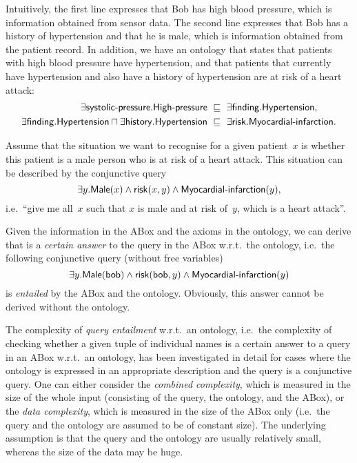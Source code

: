 \noindent
Intuitively, the first line expresses that Bob has high blood pressure, which is
information obtained from sensor data.  The second line expresses that Bob has a
history of hypertension and that he is male, which is information obtained from
the patient record.
%
In addition, we have an ontology that states that patients with high blood
pressure have hypertension, and that patients that currently have hypertension
and also have a history of hypertension are at risk of a heart attack:
\begin{align*}
     \exists\mathsf{systolic\text{-}pressure}.\mathsf{High\text{-}pressure}\
    &\sqsubseteq\ \exists\mathsf{finding}.\mathsf{Hypertension},\\
     \exists\mathsf{finding}.\mathsf{Hypertension}\sqcap\exists\mathsf{history}.\mathsf{Hypertension}\
    &\sqsubseteq\ \exists\mathsf{risk}.\mathsf{Myocardial\text{-}infarction}.
\end{align*}

Assume that the situation we want to recognise for a given patient~$x$ is
whether this patient is a male person who is at risk of a heart attack.  This
situation can be described by the conjunctive query
\[\exists y.\mathsf{Male}(x)\land\mathsf{risk}(x,y)\land\mathsf{Myocardial\text{-}infarction}(y),\]
i.e.~\enquote{give me all~$x$ such that $x$ is male and at risk of~$y$, which is
a heart attack}.

Given the information in the ABox and the axioms in the ontology, we can derive
that \bob is a \emph{certain answer} to the query in the ABox w.r.t.\ the
ontology, i.e.~the following conjunctive query (without free variables)
\[\exists y.\mathsf{Male}(\mathsf{bob})\land\mathsf{risk}(\mathsf{bob},y)\land\mathsf{Myocardial\text{-}infarction}(y)\]
is \emph{entailed} by the ABox and the ontology.
%
Obviously, this answer cannot be derived without the ontology.

The complexity of \emph{query entailment} w.r.t.\ an ontology, i.e.~the
complexity of checking whether a given tuple of individual names is a certain
answer to a query in an ABox w.r.t.\ an ontology, has been investigated in
detail for cases where the ontology is expressed in an appropriate description
and the query is a conjunctive query.
%
One can either consider the \emph{combined complexity}, which is measured in the
size of the whole input (consisting of the query, the ontology, and the ABox),
or the \emph{data complexity}, which is measured in the size of the ABox only
(i.e.~the query and the ontology are assumed to be of constant size).  The
underlying assumption is that the query and the ontology are usually relatively
small, whereas the size of the data may be huge.

